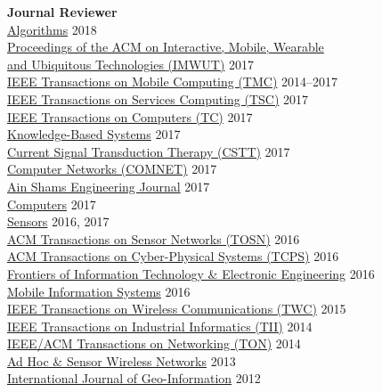 {\bf Journal Reviewer}\\
{\href{http://www.mdpi.com/journal/algorithms}{Algorithms}} \hfill 2018\\
{\href{https://imwut.acm.org}{Proceedings of the ACM on Interactive, Mobile, Wearable \\and Ubiquitous Technologies (IMWUT)}} \hfill 2017\\
{\href{https://www.computer.org/portal/web/tmc}{IEEE Transactions on Mobile Computing (TMC)}} \hfill 2014--2017\\
{\href{https://www.computer.org/web/tsc}{IEEE Transactions on Services Computing (TSC)}} \hfill 2017\\
{\href{https://www.computer.org/web/tc}{IEEE Transactions on Computers (TC)}} \hfill 2017\\
{\href{https://www.journals.elsevier.com/knowledge-based-systems}{Knowledge-Based Systems}} \hfill 2017\\
{\href{http://benthamscience.com/journals/current-signal-transduction-therapy/}{Current Signal Transduction Therapy (CSTT)}} \hfill 2017\\
{\href{http://ees.elsevier.com/comnet/}{Computer Networks (COMNET)}} \hfill 2017\\
{\href{https://www.journals.elsevier.com/ain-shams-engineering-journal}{Ain Shams Engineering Journal}} \hfill 2017\\
{\href{http://www.mdpi.com/journal/computers}{Computers}} \hfill 2017\\
{\href{http://www.mdpi.com/journal/sensors}{Sensors}} \hfill 2016, 2017\\
{\href{http://tosn.acm.org/}{ACM Transactions on Sensor Networks (TOSN)}} \hfill 2016\\
{\href{http://tcps.acm.org/}{ACM Transactions on Cyber-Physical Systems (TCPS)}} \hfill 2016\\
{\href{http://www.springer.com/computer/journal/11714}{Frontiers of Information Technology \& Electronic Engineering}} \hfill 2016\\
{\href{https://www.hindawi.com/journals/misy/}{Mobile Information Systems}} \hfill 2016\\
{\href{http://www.comsoc.org/twc}{IEEE Transactions on Wireless Communications (TWC)}} \hfill 2015\\
{\href{http://www.ieee-ies.org/pubs/transactions-on-industrial-informatics}{IEEE Transactions on Industrial Informatics (TII)}} \hfill 2014\\
{\href{http://www.ifp.illinois.edu/ton}{IEEE/ACM Transactions on Networking (TON)}} \hfill 2014\\
{\href{http://www.oldcitypublishing.com/AHSWN/AHSWN.html}{Ad Hoc \& Sensor Wireless Networks}} \hfill 2013\\
{\href{http://www.mdpi.com/journal/ijgi}{International Journal of Geo-Information}} \hfill 2012\\
